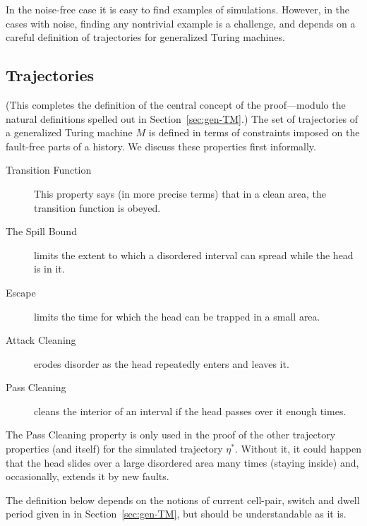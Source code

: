 \documentclass[11pt]{memoir}
\theoremstyle{definition} %
\begin{document}
In the noise-free case it is easy to find examples of simulations.
However, in the cases with noise, finding any nontrivial example 
is a challenge, and depends on a careful definition of trajectories for generalized Turing machines.

\subsection{Trajectories}\label{sec:traj}

(This completes the definition of the central concept of the
proof---modulo the natural definitions spelled out in Section~\ref{sec:gen-TM}.)
The set of trajectories of a generalized Turing machine \( M \)
is defined in terms of constraints imposed on the fault-free parts of a history.
We discuss these properties first informally.

\begin{description}
\item[Transition Function] This property says (in more precise terms)
that in a clean area, the transition function is obeyed.

\item[The Spill Bound] limits the extent to which a disordered interval can spread while
the head is in it.

\item[Escape] limits the time for which the head can be trapped in a small area.

\item[Attack Cleaning] erodes disorder as the head repeatedly enters and leaves it.

\item[Pass Cleaning] cleans the interior of an
  interval if the head passes over it enough times.
  
\end{description}

\begin{remark}
The Pass Cleaning property is only used in the proof of the other trajectory properties
(and itself) for the simulated trajectory \( \eta^{*} \).
Without it, it could happen that
the head slides over a large disordered area many times (staying inside) and, occasionally,
extends it by new faults.  
\end{remark}

The definition below depends on the notions of current cell-pair, switch and dwell period given in
 in Section~\ref{sec:gen-TM}, but should be understandable as it is.
\end{document}
